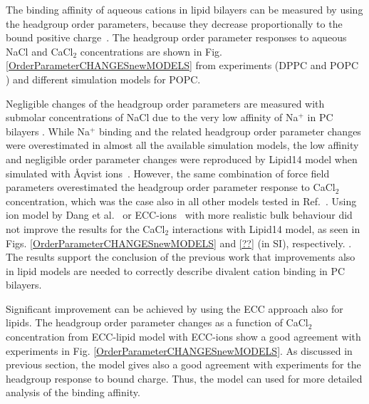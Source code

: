 \documentclass[aip,jcp,twocolumn]{revtex4}
\begin{document}
The binding affinity of aqueous cations in lipid 
bilayers can be measured by using the headgroup 
order parameters, because they decrease proportionally  
to the bound positive charge~\cite{seelig87,catte16}. 
The headgroup order parameter responses 
to aqueous NaCl and CaCl$_2$ concentrations 
are shown in Fig. \ref{OrderParameterCHANGESnewMODELS}
from experiments (DPPC \cite{akutsu81} 
and POPC \cite{altenbach84}) and different simulation models for POPC. 


Negligible changes of the headgroup order parameters are measured
with submolar concentrations of NaCl due to the very low affinity of Na$^+$
in PC bilayers \cite{akutsu81}. While Na$^+$ binding and the related 
headgroup order parameter changes were overestimated in
almost all the available simulation models, the low affinity
and negligible order parameter changes were reproduced by Lipid14 
model when simulated with \AA{}qvist ions~\cite{catte16}.
However, the same combination of force field parameters
overestimated the headgroup order parameter response to CaCl$_2$ 
concentration, which was the case also in all other models tested in
Ref.~.
Using ion model by Dang et al.~\cite{smith94,chang1999,dang2006} or
ECC-ions~\cite{jungwirth17-new-paper-to-be-published, kohagen16, Pluharova2014}
with more realistic bulk behaviour did not improve the results
for the CaCl$_2$ interactions with Lipid14 model, as seen 
in Figs. \ref{OrderParameterCHANGESnewMODELS} and \ref{??} (in SI), respectively.
.
The results support the conclusion of the previous work \cite{catte16}
that improvements also in lipid models are needed to 
correctly describe divalent cation binding in PC bilayers.

Significant improvement can be achieved by using the ECC
approach also for lipids. The headgroup order parameter changes
as a function of CaCl$_2$ concentration from ECC-lipid model with ECC-ions
show a good agreement with experiments in Fig. \ref{OrderParameterCHANGESnewMODELS}.
As discussed in previous section, the model gives also
a good agreement with experiments for
the headgroup response to bound charge.
Thus, the model can used for more detailed analysis of the
binding affinity.
\end{document}
